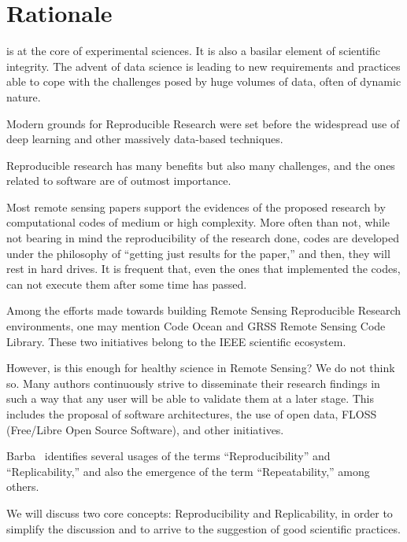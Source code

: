\documentclass[journal,twoside]{IEEEtran}
\begin{document}
\IEEEpeerreviewmaketitle

\section{Rationale}\label{Sec:Introduction}

 is at the core of experimental sciences. 
It is also a basilar element of scientific integrity. 
The advent of data science is leading to new requirements and practices able to cope with the challenges posed by huge volumes of data, often of dynamic nature. 

Modern grounds for Reproducible Research were set before the widespread use of deep learning and other massively data-based techniques.

Reproducible research has many benefits but also many challenges, and the ones related to software are of outmost importance.

Most remote sensing papers support the evidences of the proposed research by computational codes of medium or high complexity. 
More often than not, while not bearing in mind the reproducibility of the research done, codes are developed under the philosophy of ``getting just results for the paper,'' and then, they will rest in hard drives. 
It is frequent that, even the ones that implemented the codes, can not execute them after some time has passed.  

Among the efforts made towards building Remote Sensing Reproducible Research environments, one may mention Code Ocean and GRSS Remote Sensing Code Library. 
These two initiatives belong to the IEEE scientific ecosystem. 

However, is this enough for healthy science in Remote Sensing? 
We do not think so. 
Many authors continuously strive to disseminate their research findings in such a way that any user will be able to validate them at a later stage. 
This includes the proposal of software architectures, the use of open data, FLOSS (Free/Libre Open Source Software), and other initiatives.

Barba~\cite{TerminologiesforReproducibleResearch} identifies several usages of the terms ``Reproducibility'' and ``Replicability,'' and also the emergence of the term ``Repeatability,'' among others.

We will discuss two core concepts: Reproducibility and Replicability, in order to simplify the discussion and to arrive to the suggestion of good scientific practices.
\end{document}
